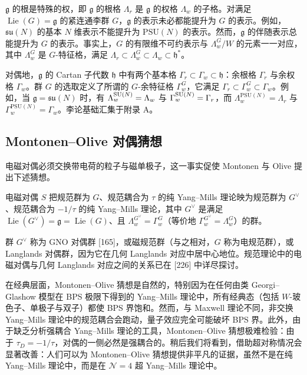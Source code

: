\begin{remark}[19.22]
$\mathfrak{g}$ 的根是特殊的权，即 $\mathfrak{g}$ 的根格 $\Lambda_r$ 是 $\mathfrak{g}$ 的权格 $\Lambda_w$ 的子格。对满足 $\operatorname{Lie}(G)=\mathfrak{g}$ 的紧连通李群 $G$，$\mathfrak{g}$ 的表示未必都能提升为 $G$ 的表示。例如，$\mathfrak{su}(N)$ 的基本 $N$ 维表示不能提升为 $\mathrm{PSU}(N)$ 的表示。然而，$\mathfrak{g}$ 的伴随表示总能提升为 $G$ 的表示。事实上，$G$ 的有限维不可约表示与 $\Lambda^G_w/W$ 的元素一一对应，其中 $\Lambda^G_w$ 是 $G$-特征格，满足 $\Lambda_r\subset\Lambda^G_w\subset\Lambda_w\subset\mathfrak{h}^*$。
\end{remark}

对偶地，$\mathfrak{g}$ 的 Cartan 子代数 $\mathfrak{h}$ 中有两个基本格 $\Gamma_r\subset\Gamma_w\subset\mathfrak{h}$：余根格 $\Gamma_r$ 与余权格 $\Gamma_w$。群 $G$ 的选取定义了所谓的 $G$-余特征格 $\Gamma^G_w$，它满足 $\Gamma_r\subset\Gamma^G_w\subset\Gamma_w$。例如，当 $\mathfrak{g}=\mathfrak{su}(N)$ 时，有 $\Lambda^{\operatorname{SU}(N)}_w=\Lambda_w$ 与 $\Gamma^{\operatorname{SU}(N)}_w=\Gamma_r$，而 $\Lambda^{\mathrm{PSU}(N)}_w=\Lambda_r$ 与 $\Gamma^{\mathrm{PSU}(N)}_w=\Gamma_w$。李论基础汇集于附录 A。


\subsection{Montonen--Olive 对偶猜想}

电磁对偶必须交换带电荷的粒子与磁单极子，这一事实促使 Montonen 与 Olive 提出下述猜想。

\begin{conjecture}
电磁对偶 $S$ 把规范群为 $G$、规范耦合为 $\tau$ 的纯 Yang--Mills 理论映为规范群为 $G^\vee$、规范耦合为 $-1/\tau$ 的纯 Yang--Mills 理论，其中 $G^\vee$ 是满足 $\operatorname{Lie}(G^\vee)=\mathfrak{g}=\operatorname{Lie}(G)$、且 $\Lambda^{G^\vee}_w=\Gamma^G_w$（等价地 $\Gamma^{G^\vee}_w=\Lambda^G_w$）的群。
\end{conjecture}

群 $G^\vee$ 称为 GNO 对偶群 [165]，或磁规范群（与之相对，$G$ 称为电规范群），或 Langlands 对偶群，因为它在几何 Langlands 对应中居中心地位。规范理论中的电磁对偶与几何 Langlands 对应之间的关系已在 [226] 中详尽探讨。

\begin{remark}[19.24]
在经典层面，Montonen--Olive 猜想是自然的，特别因为在任何由类 Georgi--Glashow 模型在 BPS 极限下得到的 Yang--Mills 理论中，所有经典态（包括 $W$-玻色子、单极子与双子）都使 BPS 界饱和。然而，与 Maxwell 理论不同，非交换 Yang--Mills 理论中的规范耦合会跑动，量子效应完全可能破坏 BPS 界。此外，由于缺乏分析强耦合 Yang--Mills 理论的工具，Montonen--Olive 猜想极难检验：由于 $\tau_D=-1/\tau$，对偶的一侧必然是强耦合的。稍后我们将看到，借助超对称情况会显著改善：人们可以为 Montonen--Olive 猜想提供非平凡的证据，虽然不是在纯 Yang--Mills 理论中，而是在 $\mathcal{N}=4$ 超 Yang--Mills 理论中。
\end{remark}

